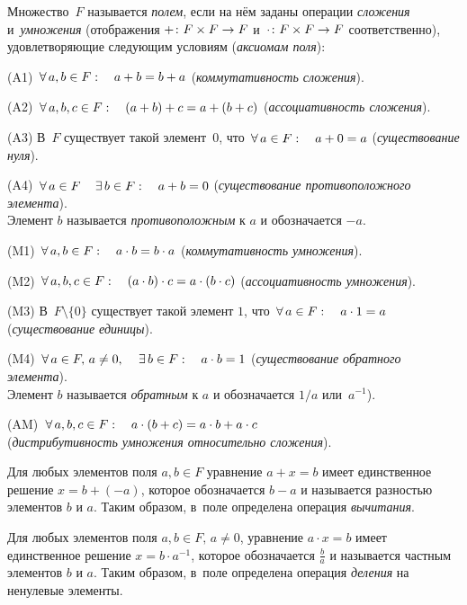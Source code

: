 \documentclass[a4paper,12pt]{article}
\begin{document}


Множество~$F$ называется \emph{полем}, если на нём заданы операции \emph{сложения} и~\emph{умножения} (отображения $ + \colon F\times F \rightarrow F$ и~$\cdot \colon F\times F \rightarrow F$ соответственно), удовлетворяющие следующим условиям (\emph{аксиомам поля}):
\begin{items}{-3}
\item[(A1)]
$\,\forall\, a,b\in F:\quad a+b=b+a$ (\emph{коммутативность сложения}).
\item[(A2)]
$\,\forall\, a,b,c\in F:\quad(a+b)+c=a+(b+c)$ (\emph{ассоциативность сложения}).
\item[(A3)]
В~$F$ существует такой элемент~$0$, что $\,\forall\, a\in F:\quad a+0=a$ (\emph{существование нуля}).
\item[(A4)]
$\,\forall\, a\in F \quad \,\exists\, b\in F:\quad a+b=0$
(\emph{существование противоположного элемента}).\\
Элемент $b$ называется \emph{противоположным} к $a$ и обозначается $-a$.
\item[(M1)]
$\,\forall\, a,b\in F:\quad a\cdot b=b\cdot a$ (\emph{коммутативность умножения}).
\item[(M2)]
$\,\forall\, a,b,c\in F:\quad (a\cdot b)\cdot c=a\cdot (b\cdot c)$ (\emph{ассоциативность умножения}).
\item[(M3)]
В~$F\setminus\{0\}$ существует такой элемент $1$, что $\,\forall\, a\in F:\quad a\cdot 1=a$ (\emph{существование единицы}).
\item[(M4)]
$\,\forall\, a\in F,\,a\ne0,\quad\,\exists\, b\in F:\quad a\cdot b=1$ (\emph{существование обратного элемента}).\\
Элемент $b$ называется \emph{обратным} к $a$ и обозначается $1/a$ или~$a^{-1}$).
\item[(AM)]
$\,\forall\, a,b,c\in F:\quad a\cdot(b+c)=a\cdot b + a\cdot c$\\ (\emph{дистрибутивность умножения относительно сложения}).
\end{items}
\vskip -3mm


Для любых элементов поля $a, b \in F$ уравнение $a+x=b$ имеет единственное решение $x = b + (-a)$, которое обозначается $b-a$ и называется  разностью элементов $b$ и $a$. Таким образом, в~поле определена операция \emph{вычитания}.

Для любых элементов поля $a, b \in F,\, a\ne 0$, уравнение $a \cdot x=b$ имеет единственное решение $x = b \cdot a^{-1}$, которое обозначается $\frac{b}{a}$ и называется  частным элементов $b$ и $a$. Таким образом, в~поле определена операция \emph{деления} на ненулевые элементы.
\end{document}
